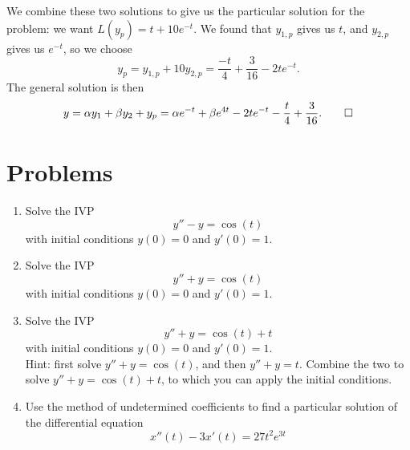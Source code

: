 \documentclass[10pt,driverfallback=hypertex]{report}
\begin{document}
We combine these two solutions to give us the particular solution for the
problem: we want $L(y_p) = t+10e^{-t}$. We found that $y_{1,p}$ gives us $t$,
and $y_{2,p}$ gives us $e^{-t}$, so we choose
\begin{dmath*}
  y_p = y_{1,p} + 10 y_{2,p} = \frac{-t}{4} + \frac{3}{16} -2 t e^{-t}.
\end{dmath*}
The general solution is then
\begin{dmath*}
y = \alpha y_1 + \beta y_2 + y_p
= \alpha e^{-t} + \beta e^{4t} -2 t e^{-t} -\frac{t}{4} + \frac{3}{16}. \qed
\end{dmath*}


\section{Problems}

\begin{enumerate}

\item
  Solve the IVP
  \begin{dmath*}
  y'' - y = \cos(t)
  \end{dmath*}
  with initial conditions $y(0)=0$ and $y'(0)=1$.

\item
  Solve the IVP
  \begin{dmath*}
  y'' + y = \cos(t)
  \end{dmath*}
  with initial conditions $y(0)=0$ and $y'(0)=1$.

\item
  Solve the IVP
  \begin{dmath*}
    y'' + y = \cos(t) + t
  \end{dmath*}
  with initial conditions $y(0)=0$ and $y'(0)=1$.\\
  Hint: first solve $y'' + y = \cos(t)$, and then $y'' + y = t$. Combine
  the two to solve $y'' + y = \cos(t) + t$, to which you can apply the
  initial conditions.

\item
  Use the method of undetermined coefficients to find a particular solution of
  the differential equation
  \begin{dmath*}
    x''(t) - 3x'(t) = 27t^2e^{3t}
  \end{dmath*}

\end{enumerate}
\end{document}
